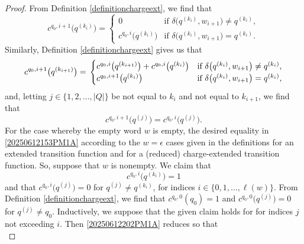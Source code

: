 \documentclass[12pt]{article}
\begin{document}
\begin{proof}
 From Definition \ref{definitionchargeext}, we find that 
\begin{equation}\label{20250612202PM1A}
 c^{q_0, i+1}\big( q^{(k_{i})} \big) = 
 \begin{cases} 
 0 & \text{if $\delta\big( q^{(k_i)}, w_{i+1} \big) \neq q^{(k_i)} $}, \\ 
 c^{q_0, i}\big( q^{(k_{i})} \big) 
 & \text{if $\delta\big( q^{(k_i)}, w_{i+1} \big) = q^{(k_i)} $}. 
 \end{cases} 
\end{equation}
 Similarly, Definition \ref{definitionchargeext} gives us that 
\begin{equation}\label{fromdefinitioncases2}
 c^{q_0, i+1}\big( q^{(k_{i+1})} \big) = \\ 
 \begin{cases} 
 c^{q_0, i}\big( q^{(k_{i+1})} \big) + c^{q_0, i}\big( q^{(k_{i})} \big) 
 & \text{if $\delta\big( q^{(k_i)}, w_{i+1} \big) \neq q^{(k_i)} $}, \\ 
 c^{q_0, i+1}\big( q^{(k_i)} \big) & \text{if $\delta\big( q^{(k_i)}, w_{i+1} \big) = q^{(k_i)} $}, 
 \end{cases} 
\end{equation}
 and, letting $j \in \{ 1, 2, \ldots, |Q| \}$ be not equal to $k_i$ and not equal to $k_{i+1}$, we find that 
\begin{equation}\label{2025061241888888888878P8M8A}
 c^{q_0, i+1}\big( q^{(j)} \big) = c^{q_0, i}\big( q^{(j)} \big). 
 \end{equation}
 For the case whereby the empty word $w$ is empty, the desired equality in 
 \eqref{20250612153PM1A} according to the $w = \epsilon$
 cases given in the definitions for an extended transition function and for a (reduced)
 charge-extended transition function. 
 So, suppose that $w$ is nonempty. 
 We claim that 
\begin{equation}\label{claimcq0i}
 c^{q_0, i}\big( q^{(k_i)} \big) = 1
\end{equation}
 and that $c^{q_0, i}\big( q^{(j)} \big) = 0$ for $q^{(j)} \neq q^{(k_i)}$, 
 for indices $i \in \{ 0, 1, \ldots, \ell(w) \}$. 
 From Definition \ref{definitionchargeext}, 
 we find that 
 $c^{q_0, 0}(q_0) = 1$ and $c^{q_0, 0}\big( q^{(j)} \big) = 0$ 
 for $q^{(j)} \neq q_0$. Inductively, we suppose that the given claim holds for for indices $j$ not exceeding $i$. 
 Then \eqref{20250612202PM1A} reduces so that 
\begin{equation}\label{2025111000061020411PM1A}

\end{equation}
\end{proof}
\end{document}
